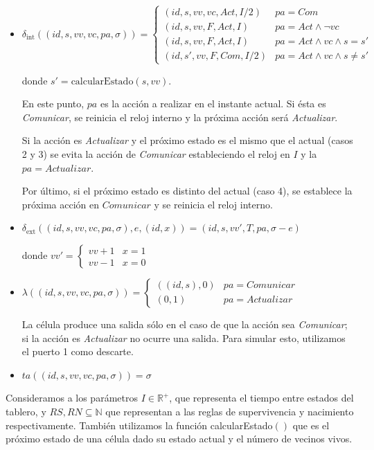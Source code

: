 \documentclass[12pt]{article}
\newcommand{\dint}{\delta_{\text{int}}}
\newcommand{\dext}{\delta_{\text{ext}}}
\newcommand{\estado}{(id, s, vv, vc, pa, \sigma)}
\newcommand{\R}{\mathbb{R}}
\newcommand{\N}{\mathbb{N}}
\begin{document}
\begin{itemize}
  \item $\dint(\estado) = \begin{cases}
      (id, s, vv, vc, Act, I/2) & pa = Com \\
      (id, s, vv, F, Act, I) & pa = Act \land \lnot vc \\
      (id, s, vv, F, Act, I) & pa = Act \land vc \land s = s' \\
      (id, s', vv, F, Com, I/2) & pa = Act \land vc \land s \neq s'
    \end{cases}$

    donde $s' = \text{calcularEstado}(s, vv)$.

    En este punto, $pa$ es la acción a realizar en el instante actual. Si ésta es \textit{Comunicar}, se reinicia el reloj interno y la próxima acción será \textit{Actualizar}.

    Si la acción es \textit{Actualizar} y el próximo estado es el mismo que el actual (casos 2 y 3) se evita la acción de \textit{Comunicar} estableciendo el reloj en $I$ y la $pa = Actualizar$.

    Por último, si el próximo estado es distinto del actual (caso 4), se establece la próxima acción en $Comunicar$ y se reinicia el reloj interno.

  \item $\dext(\estado, e, (id, x)) = (id, s, vv', T, pa, \sigma - e)$

    donde $vv' = \begin{cases}
      vv + 1 & x = 1 \\
      vv - 1 & x = 0
    \end{cases}$

  \item $\lambda(\estado) = \begin{cases}
      ((id, s), 0) & pa = Comunicar \\
      (0, 1) & pa = Actualizar
    \end{cases}$

    La célula produce una salida sólo en el caso de que la acción sea \textit{Comunicar}; si la acción es \textit{Actualizar} no ocurre una salida. Para simular esto, utilizamos el puerto 1 como descarte.

  \item $ta(\estado) = \sigma$
\end{itemize}

Consideramos a los parámetros $I \in \R^+$, que representa el tiempo entre estados del tablero, y $RS, RN \subseteq \N$ que representan a las reglas de supervivencia y nacimiento respectivamente. También utilizamos la función calcularEstado$()$ que es el próximo estado de una célula dado su estado actual y el número de vecinos vivos.
\end{document}

